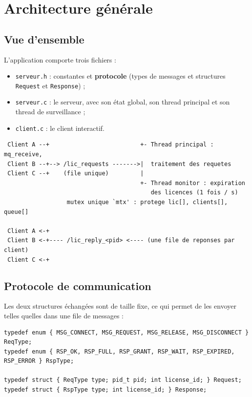 \documentclass[11pt,a4paper]{article}
\newcommand{\code}[1]{\texttt{#1}}
\begin{document}
\section{Architecture générale}

\subsection{Vue d'ensemble}

L'application comporte trois fichiers :
\begin{itemize}
  \item \code{serveur.h} : constantes et \textbf{protocole} (types de messages et structures \code{Request} et \code{Response}) ;
  \item \code{serveur.c} : le serveur, avec son état global, son thread principal et son thread de surveillance ;
  \item \code{client.c} : le client interactif.
\end{itemize}

\begin{lstlisting}
 Client A --+                          +- Thread principal : mq_receive,
 Client B --+--> /lic_requests ------->|  traitement des requetes
 Client C --+    (file unique)         |
                                       +- Thread monitor : expiration
                                          des licences (1 fois / s)
                  mutex unique `mtx' : protege lic[], clients[], queue[]

 Client A <-+
 Client B <-+---- /lic_reply_<pid> <---- (une file de reponses par client)
 Client C <-+
\end{lstlisting}

\subsection{Protocole de communication}

Les deux structures échangées sont de taille fixe, ce qui permet de les envoyer telles quelles dans une file de messages :

\begin{lstlisting}[style=cstyle]
typedef enum { MSG_CONNECT, MSG_REQUEST, MSG_RELEASE, MSG_DISCONNECT } ReqType;
typedef enum { RSP_OK, RSP_FULL, RSP_GRANT, RSP_WAIT, RSP_EXPIRED, RSP_ERROR } RspType;

typedef struct { ReqType type; pid_t pid; int license_id; } Request;
typedef struct { RspType type; int license_id; } Response;
\end{lstlisting}
\end{document}
